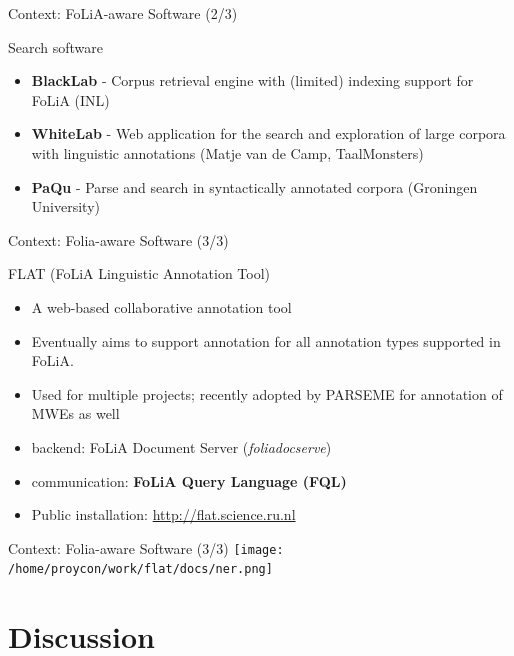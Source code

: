 \documentclass[xcolor=table,10pt,t]{beamer}
\begin{document}
\begin{frame}{Context: FoLiA-aware Software (2/3)}
    \begin{block}{Search software}
      \begin{itemize}
        \item \textbf{BlackLab} - Corpus retrieval engine with (limited) indexing support for FoLiA (INL)
        \item \textbf{WhiteLab} - Web application for the search and
            exploration of large corpora with linguistic annotations (Matje van de Camp, TaalMonsters)
        \item \textbf{PaQu} - Parse and search in syntactically annotated
            corpora (Groningen University)
      \end{itemize}
    \end{block}
\end{frame}

\begin{frame}{Context: Folia-aware Software (3/3)}
    \begin{block}{FLAT (FoLiA Linguistic Annotation Tool)}
      \begin{itemize}
            \item A web-based collaborative annotation tool
            \item Eventually aims to support annotation for all annotation
                types supported in FoLiA.
            \item Used for multiple projects; recently adopted by PARSEME for annotation of MWEs as well
            \item backend: FoLiA Document Server (\emph{foliadocserve})
            \item communication: \textbf{FoLiA Query Language (FQL)}
            \item Public installation: \url{http://flat.science.ru.nl}
      \end{itemize}
    \end{block}
\end{frame}

\begin{frame}{Context: Folia-aware Software (3/3)}
        \texttt{[image: /home/proycon/work/flat/docs/ner.png]}
\end{frame}

\section{Discussion}
\end{document}
